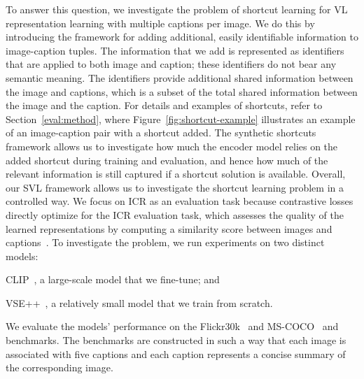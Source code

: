 To answer this question, we investigate the problem of shortcut learning for \ac{VL} representation learning with multiple captions per image.
We do this by introducing the  framework for adding additional, easily identifiable information to image-caption tuples. 
The information that we add is represented as identifiers that are applied to both image and caption; these identifiers do not bear any semantic meaning. 
The identifiers provide additional shared information between the image and captions, which is a subset of the total shared information between the image and the caption.
For details and examples of shortcuts, refer to Section~\ref{eval:method}, where Figure~\ref{fig:shortcut-example} illustrates an example of an image-caption pair with a shortcut added.
The synthetic shortcuts framework allows us to investigate how much the encoder model relies on the added shortcut during training and evaluation, and hence how much of the relevant information is still captured if a shortcut solution is available.
Overall, our \ac{SVL} framework allows us to investigate the shortcut learning problem in a controlled way. 
We focus on \ac{ICR} as an evaluation task because contrastive losses directly optimize for the \ac{ICR} evaluation task, which assesses the quality of the learned representations by computing a similarity score between images and captions~\citep{radford2021learning, yuksekgonul2023when}.
To investigate the problem, we run experiments on two distinct models:
\begin{enumerate*}[label=(\roman*)]
	\item CLIP~\citep{radford2019language}, a large-scale model that we fine-tune; and
	\item VSE++~\citep{faghri2018improving}, a relatively small model that we train from scratch.
\end{enumerate*}
We evaluate the models' performance on the \ac{Flickr30k}~\citep{young2014image} and \ac{MS-COCO}~\citep{lin2014microsoft, chen2015microsoft} and benchmarks. 
The benchmarks are constructed in such a way that each image is associated with five captions and each caption represents a concise summary of the corresponding image.

